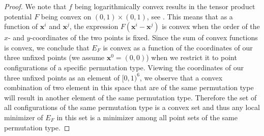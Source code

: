 \documentclass[a4paper,12pt]{article}
\numberwithin{equation}{section}
\theoremstyle{definition}
\newcommand{\bx}{\mathbf{x}}
\begin{document}
\begin{proof}
    We note that $f$ being logarithmically convex results in the tensor product potential $F$ being convex on $(0,1)\times(0,1)$, see \cite{SS12b}. This means that as a function of $\bx^i$ and $\bx^j$, the expression $F(\bx^i-\bx^j)$ is convex when the order  of the $x$- and $y$-coordinates of the two points is fixed. Since the sum of convex functions is convex, we  conclude that $E_F$ is convex as a function of the coordinates of our three unfixed points (we assume $\bx^0=(0,0)$) when we restrict it to point configurations of a specific permutation type. Viewing the coordinates of our three unfixed points as an element of $[0,1)^6$, we observe that a convex combination of two element in this space that are of the same permutation type will result in another element of the same permutation type. Therefore the set of all configurations of the same permutation type is a convex set and thus any local minimizer of $E_F$ in this set is a minimizer among all point sets of the same permutation type.


\end{proof}
\end{document}
